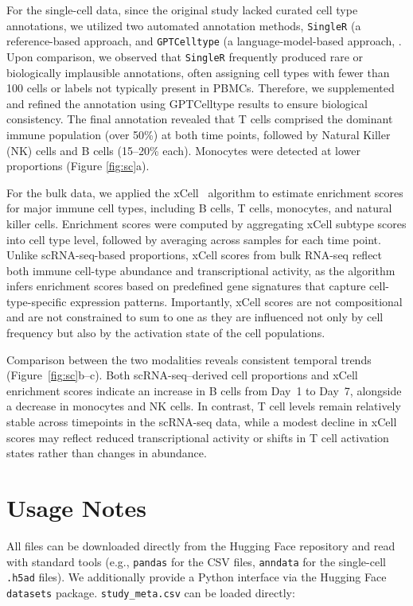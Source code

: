 \documentclass[
  12pt]{article}
\begin{document}
For the single-cell data, since the original study lacked curated cell type annotations, we utilized two automated annotation methods, \texttt{SingleR} (a reference-based approach, \citep{aran2019reference} and \texttt{GPTCelltype} (a language-model-based approach, \citep{hou2024gptcelltype}. Upon comparison, we observed that \texttt{SingleR} frequently produced rare or biologically implausible annotations, often assigning cell types with fewer than 100 cells or labels not typically present in PBMCs. Therefore, we supplemented and refined the annotation using GPTCelltype results to ensure biological consistency. The final annotation revealed that T cells comprised the dominant immune population (over 50\%) at both time points, followed by Natural Killer (NK) cells and B cells (15–20\% each). Monocytes were detected at lower proportions (Figure \ref{fig:sc}a).

For the bulk data, we applied the xCell~\citep{aran2017xcell} algorithm to estimate enrichment scores for major immune cell types, including B cells, T cells, monocytes, and natural killer cells. Enrichment scores were computed by aggregating xCell subtype scores into cell type level, followed by averaging across samples for each time point. Unlike scRNA-seq-based proportions, xCell scores from bulk RNA-seq reflect both immune cell-type abundance and transcriptional activity, as the algorithm infers enrichment scores based on predefined gene signatures that capture cell-type-specific expression patterns. Importantly, xCell scores are not compositional and are not constrained to sum to one as they are influenced not only by cell frequency but also by the activation state of the cell populations. 

Comparison between the two modalities reveals consistent temporal trends (Figure~\ref{fig:sc}b--c). Both scRNA-seq–derived cell proportions and xCell enrichment scores indicate an increase in B cells from Day~1 to Day~7, alongside a decrease in monocytes and NK cells. In contrast, T cell levels remain relatively stable across timepoints in the scRNA-seq data, while a modest decline in xCell scores may reflect reduced transcriptional activity or shifts in T cell activation states rather than changes in abundance.

\section{Usage Notes}

All files can be downloaded directly from the Hugging Face repository and read with standard tools (e.g., \texttt{pandas} for the CSV files, \texttt{anndata} for the single-cell \texttt{.h5ad} files). We additionally provide a Python interface via the Hugging Face \texttt{datasets} package. \texttt{study\_meta.csv} can be loaded directly:
\end{document}
